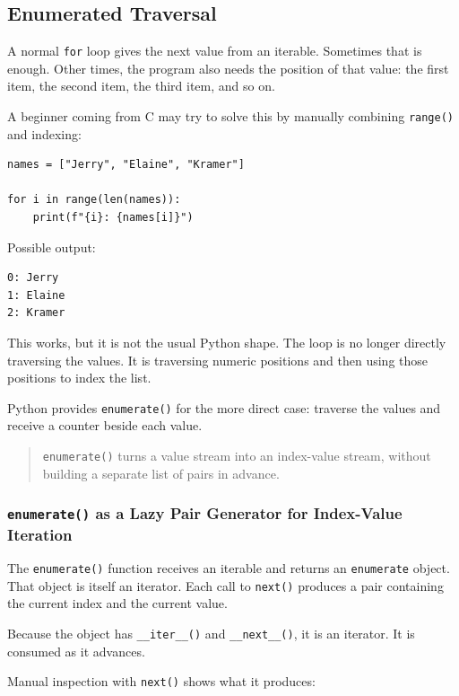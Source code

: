 \subsection{Enumerated Traversal}

A normal \texttt{for} loop gives the next value from an iterable. Sometimes that is enough. Other times, the program also needs the position of that value: the first item, the second item, the third item, and so on.

A beginner coming from C may try to solve this by manually combining \texttt{range()} and indexing:

\begin{verbatim}
names = ["Jerry", "Elaine", "Kramer"]

for i in range(len(names)):
    print(f"{i}: {names[i]}")
\end{verbatim}

Possible output:

\begin{verbatim}
0: Jerry
1: Elaine
2: Kramer
\end{verbatim}

This works, but it is not the usual Python shape. The loop is no longer directly traversing the values. It is traversing numeric positions and then using those positions to index the list.

Python provides \texttt{enumerate()} for the more direct case: traverse the values and receive a counter beside each value.

\begin{quote}
\texttt{enumerate()} turns a value stream into an index-value stream, without building a separate list of pairs in advance.
\end{quote}

\subsubsection{\texttt{enumerate()} as a Lazy Pair Generator for Index-Value Iteration}

The \texttt{enumerate()} function receives an iterable and returns an \texttt{enumerate} object. That object is itself an iterator. Each call to \texttt{next()} produces a pair containing the current index and the current value.

Because the object has \texttt{\_\_iter\_\_()} and \texttt{\_\_next\_\_()}, it is an iterator. It is consumed as it advances.

Manual inspection with \texttt{next()} shows what it produces:

